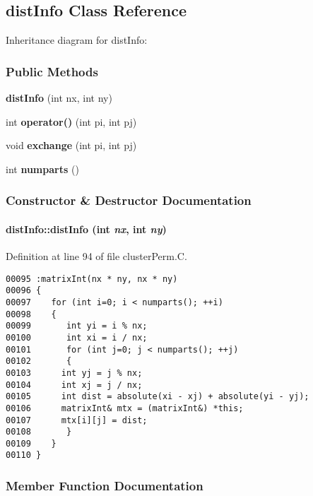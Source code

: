 \subsection{dist\-Info  Class Reference}
\label{distInfo}
Inheritance diagram for dist\-Info:\begin{figure}[H]
\begin{center}
\leavevmode
\setlength{\epsfysize}{2cm}
\end{center}
\end{figure}
\subsubsection*{Public Methods}
\begin{CompactItemize}
\item 
{\bf dist\-Info} (int nx, int ny)
\item 
int {\bf operator()} (int pi, int pj)
\item 
void {\bf exchange} (int pi, int pj)
\item 
int {\bf numparts} ()
\end{CompactItemize}


\subsubsection{Constructor \& Destructor Documentation}
\label{distInfo_a0}
\paragraph{\setlength{\rightskip}{0pt plus 5cm}dist\-Info::dist\-Info (int {\em nx}, int {\em ny})}\hfill



Definition at line 94 of file cluster\-Perm.C.\small\begin{verbatim}00095 :matrixInt(nx * ny, nx * ny)
00096 {
00097    for (int i=0; i < numparts(); ++i)
00098    {
00099       int yi = i % nx;
00100       int xi = i / nx;
00101       for (int j=0; j < numparts(); ++j)
00102       {
00103      int yj = j % nx;
00104      int xj = j / nx;
00105      int dist = absolute(xi - xj) + absolute(yi - yj);
00106      matrixInt& mtx = (matrixInt&) *this;
00107      mtx[i][j] = dist;
00108       }
00109    }
00110 }
\end{verbatim}\normalsize 


\subsubsection{Member Function Documentation}
\label{distInfo_a2}
